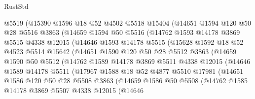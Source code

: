 \begin{lexlean}{RustStd}
\begin{coremodule}
          @5519
          (@15390
            @1596
            @18
            @52
            @4502
            @5518
            @15404
            (@14651
              @1594
              @120
              @50
              @28
              @5516
              @3863
              (@14659
                @1594
                @50
                @5516
                (@14762
                  @1593
                  @14178
                  @3869
                  @5515
                  @4338
                  @12015
                  (@14646
                    @1593
                    @14178
                    @5515
                    (@15628
                      @1592
                      @18
                      @52
                      @4523
                      @5514
                      @15642
                      (@14651
                        @1590
                        @120
                        @50
                        @28
                        @5512
                        @3863
                        (@14659
                          @1590
                          @50
                          @5512
                          (@14762
                            @1589
                            @14178
                            @3869
                            @5511
                            @4338
                            @12015
                            (@14646
                              @1589
                              @14178
                              @5511
                              (@17967
                                @1588
                                @18
                                @52
                                @4877
                                @5510
                                @17981
                                (@14651
                                  @1586
                                  @120
                                  @50
                                  @28
                                  @5508
                                  @3863
                                  (@14659
                                    @1586
                                    @50
                                    @5508
                                    (@14762
                                      @1585
                                      @14178
                                      @3869
                                      @5507
                                      @4338
                                      @12015
                                      (@14646

\end{coremodule}
\end{lexlean}
